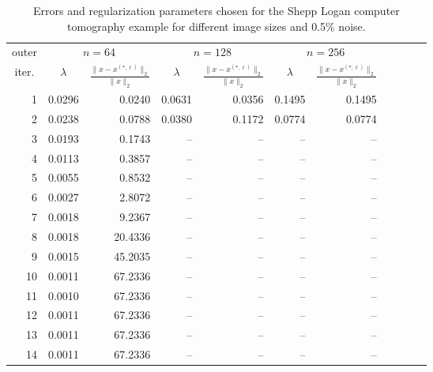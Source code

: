\begin{table}[htp]
\caption{Errors and regularization parameters chosen for the Shepp Logan computer tomography example for different image sizes and 0.5\% noise.}
\begin{center}
\begin{tabular}{|r|r|r|r|r|r|r|r|r|r|r|}
\hline
\multicolumn{1}{|c|}{outer} & \multicolumn{2}{c|}{$n = 64$} & \multicolumn{2}{c|}{$n = 128$} & \multicolumn{2}{c|}{$n = 256$} \\\cline{2-7}
\multicolumn{1}{|c|}{iter.} & \multicolumn{1}{c|}{$\lambda$} & \multicolumn{1}{c|}{$\frac{\|x - x^{(*,\ell)}\|_2}{\|x\|_2}$} & \multicolumn{1}{c|}{$\lambda$} & \multicolumn{1}{c|}{$\frac{\|x - x^{(*,\ell)}\|_2}{\|x\|_2}$}  & \multicolumn{1}{c|}{$\lambda$} & \multicolumn{1}{c|}{$\frac{\|x - x^{(*,\ell)}\|_2}{\|x\|_2}$} \\
\hline
1 & 0.0296 & 0.0240 & 0.0631 & 0.0356 & 0.1495 & 0.1495 \\
2 & 0.0238 & 0.0788 & 0.0380 & 0.1172 & 0.0774 & 0.0774 \\
3 & 0.0193 & 0.1743 & -- & -- & -- & -- \\
4 & 0.0113 & 0.3857 & -- & -- & -- & -- \\
5 & 0.0055 & 0.8532 & -- & -- & -- & -- \\
6 & 0.0027 & 2.8072 & -- & -- & -- & -- \\
7 & 0.0018 & 9.2367 & -- & -- & -- & -- \\
8 & 0.0018 & 20.4336 & -- & -- & -- & -- \\
9 & 0.0015 & 45.2035 & -- & -- & -- & -- \\
10 & 0.0011 & 67.2336 & -- & -- & -- & -- \\
11 & 0.0010 & 67.2336 & -- & -- & -- & -- \\
12 & 0.0011 & 67.2336 & -- & -- & -- & -- \\
13 & 0.0011 & 67.2336 & -- & -- & -- & -- \\
14 & 0.0011 & 67.2336 & -- & -- & -- & -- \\
\hline
\end{tabular}
\end{center}
\label{tab:full_angle_errs_and_reg_params}
\end{table}%
